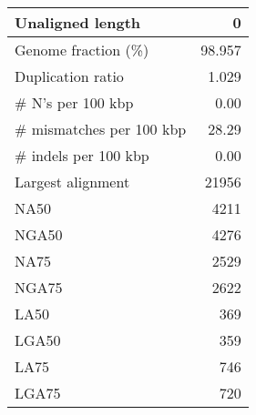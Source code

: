 \documentclass[12pt,a4paper]{article}
\begin{document}
\begin{table}[ht]
\begin{center}
\begin{tabular}{|l*{1}{|r}|}
Unaligned length & 0 \\ \hline
Genome fraction (\%) & 98.957 \\ \hline
Duplication ratio & 1.029 \\ \hline
\# N's per 100 kbp & 0.00 \\ \hline
\# mismatches per 100 kbp & 28.29 \\ \hline
\# indels per 100 kbp & 0.00 \\ \hline
Largest alignment & 21956 \\ \hline
NA50 & 4211 \\ \hline
NGA50 & 4276 \\ \hline
NA75 & 2529 \\ \hline
NGA75 & 2622 \\ \hline
LA50 & 369 \\ \hline
LGA50 & 359 \\ \hline
LA75 & 746 \\ \hline
LGA75 & 720 \\ \hline
\end{tabular}
\end{center}
\end{table}
\end{document}
